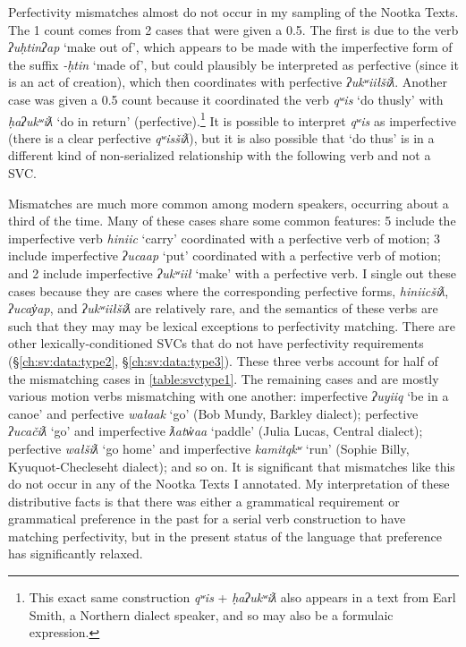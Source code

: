 Perfectivity mismatches almost do not occur in my sampling of the Nootka Texts. The 1 count comes from 2 cases that were given a 0.5. The first is due to the verb \textit{ʔuḥtinʔap} `make out of', which appears to be made with the imperfective form of the suffix \textit{-ḥtin} `made of', but could plausibly be interpreted as perfective (since it is an act of creation), which then coordinates with perfective \textit{ʔukʷiiłšiƛ}. Another case was given a 0.5 count because it coordinated the verb \textit{qʷis} `do thusly' with \textit{ḥaʔukʷiƛ} `do in return' (perfective).\footnote{This exact same construction \textit{qʷis} + \textit{ḥaʔukʷiƛ} also appears in a text from Earl Smith, a Northern dialect speaker, and so may also be a formulaic expression.} It is possible to interpret \textit{qʷis} as imperfective (there is a clear perfective \textit{qʷisšiƛ}), but it is also possible that `do thus' is in a different kind of non-serialized relationship with the following verb and not a SVC.

Mismatches are much more common among modern speakers, occurring about a third of the time. Many of these cases share some common features: 5 include the imperfective verb \textit{hiniic} `carry' coordinated with a perfective verb of motion; 3 include imperfective \textit{ʔucaap} `put' coordinated with a perfective verb of motion; and 2 include imperfective \textit{ʔukʷiił} `make' with a perfective verb. I single out these cases because they are cases where the corresponding perfective forms, \textit{hiniicšiƛ}, \textit{ʔucay̓ap}, and \textit{ʔukʷiiłšiƛ} are relatively rare, and the semantics of these verbs are such that they may may be lexical exceptions to perfectivity matching. There are other lexically-conditioned SVCs that do not have perfectivity requirements (\S\ref{ch:sv:data:type2}, \S\ref{ch:sv:data:type3}). These three verbs account for half of the mismatching cases in \cref{table:svctype1}. The remaining cases and are mostly various motion verbs mismatching with one another: imperfective \textit{ʔuyiiq} `be in a canoe' and perfective \textit{wałaak} `go' (Bob Mundy, Barkley dialect); perfective \textit{ʔucačiƛ} `go' and imperfective \textit{ƛatw̓aa} `paddle' (Julia Lucas, Central dialect); perfective \textit{wałšiƛ} `go home' and imperfective \textit{kamitqkʷ} `run' (Sophie Billy, Kyuquot-Checleseht dialect); and so on. It is significant that mismatches like this do not occur in any of the Nootka Texts I annotated. My interpretation of these distributive facts is that there was either a grammatical requirement or grammatical preference in the past for a serial verb construction to have matching perfectivity, but in the present status of the language that preference has significantly relaxed.

